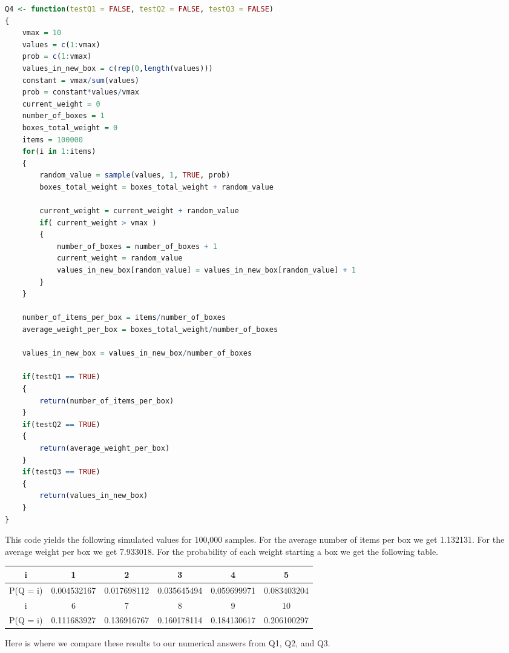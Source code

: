 \documentclass[10pt,a4paper]{article}
\begin{document}
\begin{lstlisting}[language = R]
Q4 <- function(testQ1 = FALSE, testQ2 = FALSE, testQ3 = FALSE)
{
	vmax = 10
	values = c(1:vmax)
	prob = c(1:vmax)
	values_in_new_box = c(rep(0,length(values)))
	constant = vmax/sum(values)
	prob = constant*values/vmax
	current_weight = 0
	number_of_boxes = 1
	boxes_total_weight = 0
	items = 100000
	for(i in 1:items)
	{
		random_value = sample(values, 1, TRUE, prob)
		boxes_total_weight = boxes_total_weight + random_value
		
		current_weight = current_weight + random_value
		if( current_weight > vmax )
		{
			number_of_boxes = number_of_boxes + 1
			current_weight = random_value
			values_in_new_box[random_value] = values_in_new_box[random_value] + 1
		}
	}
	
	number_of_items_per_box = items/number_of_boxes
	average_weight_per_box = boxes_total_weight/number_of_boxes
	
	values_in_new_box = values_in_new_box/number_of_boxes
	
	if(testQ1 == TRUE)
	{
		return(number_of_items_per_box)
	}
	if(testQ2 == TRUE)
	{
		return(average_weight_per_box)
	}
	if(testQ3 == TRUE)
	{
		return(values_in_new_box)
	}
}

\end{lstlisting}

This code yields the following simulated values for 100,000 samples. For the average number of items per box we get 1.132131. For the average weight per box we get 7.933018. For the probability of each weight starting a box we get the following table.
\begin{center}
\begin{tabu}{ |c|c|c|c|c|c| } 
	\hline
	i & 1 & 2 & 3 & 4 & 5 \\
	\hline
	P(Q = i) & 0.004532167 & 0.017698112 & 0.035645494 & 0.059699971 & 0.083403204   \\ 
	\hline
	i & 6 & 7 & 8 & 9 & 10\\
	\hline
	P(Q = i) & 0.111683927 & 0.136916767 & 0.160178114 & 0.184130617 & 0.206100297 \\
	\hline
\end{tabu} 
\end{center}

Here is where we compare these results to our numerical answers from Q1, Q2, and Q3.
\end{document}
